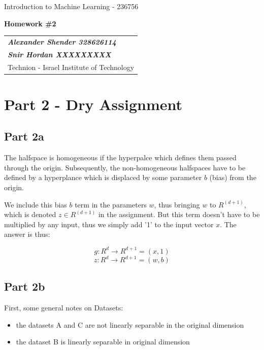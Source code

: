 \documentclass[a4paper]{iacas}
\begin{document}
\begin{center}
 \large Introduction to Machine Learning - 236756
 \end{center}
\begin{center}
\large\textbf{Homework \#2}
 \end{center}


\begin{tabular}{l}
\\
{\bf\textit{Alexander Shender 328626114}} \\
{\bf\textit{Snir Hordan XXXXXXXXX}} \\
Technion - Israel Institute of Technology
\end{tabular}

\vspace{2em}

\section{Part 2 - Dry Assignment}

\subsection{Part 2a}
The halfspace is homogeneous if the hyperpalce which defines them passed through the origin.
Subsequently, the non-homogeneous halfspaces have to be defined by a hyperplance which is displaced by some parameter
$b$ (bias) from the origin.

We include this bias $b$ term in the parameters $w$, thus bringing $w$ to $R^(d+1)$, which is denoted $z \in R^(d+1)$ in the assignment.
But this term doesn't have to be multiplied by any input, thus we simply add '1' to the input vector $x$. The answer is thus:

$$ g : R^d \rightarrow R^{d+1} = (x, 1) $$
$$ z : R^d \rightarrow R^{d+1} = (w, b) $$


\newpage
\subsection{Part 2b}



First, some general notes on Datasets:
\begin{itemize}
  \item the datasets A and C are not linearly separable in the original dimension
  \item the dataset B is linearly separable in original dimension
\end{itemize}
\end{document}
